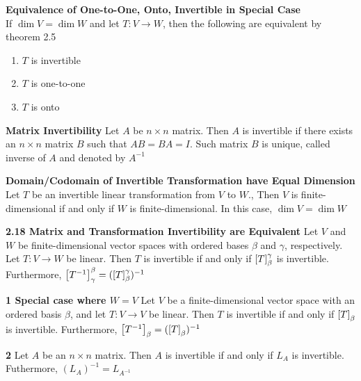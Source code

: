 \documentclass[11pt]{article}
\begin{document}
\begin{proposition*}
    \textbf{Equivalence of One-to-One, Onto, Invertible in Special Case} \\
    If $\dim{V} = \dim{W}$ and let $T:V\to W$, then the following are equivalent by theorem 2.5 
    \begin{enumerate}
        \item $T$ is invertible 
        \item $T$ is one-to-one 
        \item $T$ is onto
    \end{enumerate}
\end{proposition*}

\begin{defn*}
    \textbf{Matrix Invertibility} Let $A$ be $n\times n$ matrix. Then $A$ is invertible if there exists an $n\times n$ matrix $B$ such that $AB = BA = I$. Such matrix $B$ is unique, called inverse of $A$ and denoted by $A^{-1}$
\end{defn*}

\begin{lemma*}
    \textbf{Domain/Codomain of Invertible Transformation have Equal Dimension} 
    Let $T$ be an invertible linear transformation from $V$ to $W$., Then $V$ is finite-dimensional if and only if $W$ is finite-dimensional. In this case, $\dim{V} = \dim{W}$
\end{lemma*}

\begin{theorem*}
    \textbf{2.18 Matrix and Transformation Invertibility are Equivalent} Let $V$ and $W$ be finite-dimensional vector spaces with ordered bases $\beta$ and $\gamma$, respectively. Let $T:V\to W$ be linear. Then $T$ is invertible if and only if $\left[ T \right]_{\beta}^{\gamma}$ is invertible. Furthermore, $\left[ T^{-1} \right]_{\gamma}^{\beta} = (\left[ T \right]_{\beta}^{\gamma})^{-1}$
\end{theorem*}

\begin{corollary*}
    \textbf{1 Special case where $W=V$} Let $V$ be a finite-dimensional vector space with an ordered basis $\beta$, and let $T:V\to V$ be linear. Then $T$ is invertible if and only if $\left[ T \right]_{\beta}$ is invertible. Furthermore, $\left[ T^{-1} \right]_{\beta} = (\left[ T \right]_{\beta})^{-1}$
\end{corollary*}

\begin{corollary*}
    \textbf{2} Let $A$ be an $n\times n$ matrix. Then $A$ is invertible if and only if $L_A$ is invertible. Futhermore, $(L_A)^{-1} = L_{A^{-1}}$
\end{corollary*}
\end{document}
